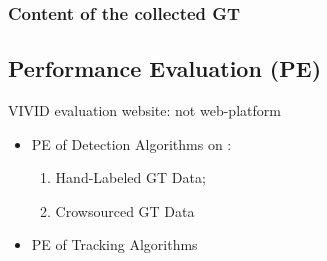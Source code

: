 \subsubsection{Content of the collected GT}
\subsection{Performance Evaluation (PE)}
VIVID evaluation website: not web-platform
\begin{itemize}
\item PE of Detection Algorithms on :
\begin{enumerate}
\item Hand-Labeled GT Data;
\item Crowsourced GT Data
\end{enumerate}
\item PE of Tracking Algorithms
\end{itemize}

